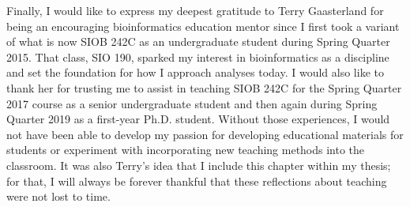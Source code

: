 Finally, I would like to express my deepest gratitude to Terry Gaasterland for being an encouraging bioinformatics education mentor since I first took a variant of what is now SIOB 242C as an undergraduate student during Spring Quarter 2015. That class, SIO 190, sparked my interest in bioinformatics as a discipline and set the foundation for how I approach analyses today. I would also like to thank her for trusting me to assist in teaching SIOB 242C for the Spring Quarter 2017 course as a senior undergraduate student and then again during Spring Quarter 2019 as a first-year Ph.D. student. Without those experiences, I would not have been able to develop my passion for developing educational materials for students or experiment with incorporating new teaching methods into the classroom. It was also Terry's idea that I include this chapter within my thesis; for that, I will always be forever thankful that these reflections about teaching were not lost to time.
